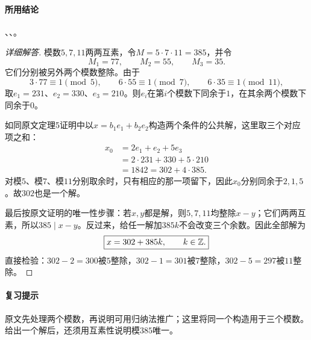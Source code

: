\paragraph{所用结论}、、。
\begin{proof}[详细解答]
模数$5,7,11$两两互素，令$M=5\cdot7\cdot11=385$，并令
\[
M_1=77,\qquad M_2=55,\qquad M_3=35.
\]
它们分别被另外两个模数整除。由于
\[
3\cdot77\equiv1\pmod5,\qquad
6\cdot55\equiv1\pmod7,\qquad
6\cdot35\equiv1\pmod{11},
\]
取$e_1=231$、$e_2=330$、$e_3=210$。则$e_i$在第$i$个模数下同余于$1$，在其余两个模数下同余于$0$。

如同原文定理5证明中以$x=b_1e_1+b_2e_2$构造两个条件的公共解，这里取三个对应项之和：
\begin{align*}
x_0&=2e_1+e_2+5e_3\\
&=2\cdot231+330+5\cdot210\\
&=1842=302+4\cdot385.
\end{align*}
对模$5$、模$7$、模$11$分别取余时，只有相应的那一项留下，因此$x_0$分别同余于$2,1,5$。故$302$也是一个解。

最后按原文证明的唯一性步骤：若$x,y$都是解，则$5,7,11$均整除$x-y$；它们两两互素，所以$385\mid x-y$。反过来，给任一解加$385k$不会改变三个余数。因此全部解为
\[
\boxed{x=302+385k,\qquad k\in\mathbb Z.}
\]
直接检验：$302-2=300$被$5$整除，$302-1=301$被$7$整除，$302-5=297$被$11$整除。
\end{proof}
\paragraph{复习提示}原文先处理两个模数，再说明可用归纳法推广；这里将同一个构造用于三个模数。给出一个解后，还须用互素性说明模$385$唯一。
